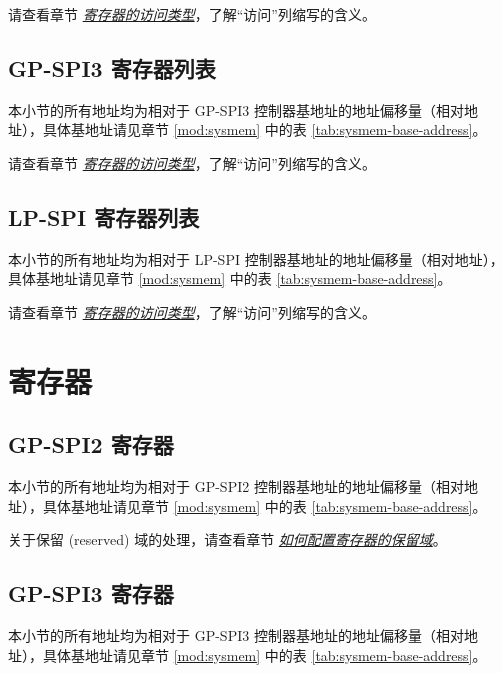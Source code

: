 \documentclass[main\_\_CN.tex]{subfiles}
\begin{document}
请查看章节 \hyperref[glossary-access-types]{\textit{寄存器的访问类型}}，了解“访问”列缩写的含义。


\subsection{GP-SPI3 寄存器列表}
\label{sec:spi3-reg-summ}
本小节的所有地址均为相对于 GP-SPI3 控制器基地址的地址偏移量（相对地址），具体基地址请见章节 \ref{mod:sysmem} \textit{} 中的表 \ref{tab:sysmem-base-address}。

请查看章节 \hyperref[glossary-access-types]{\textit{寄存器的访问类型}}，了解“访问”列缩写的含义。


\subsection{LP-SPI 寄存器列表}
\label{sec:lp-spi-reg-summ}
本小节的所有地址均为相对于 LP-SPI 控制器基地址的地址偏移量（相对地址），具体基地址请见章节 \ref{mod:sysmem} \textit{} 中的表 \ref{tab:sysmem-base-address}。

请查看章节 \hyperref[glossary-access-types]{\textit{寄存器的访问类型}}，了解“访问”列缩写的含义。


\section{寄存器}\label{Section:SPIREGList}

\subsection{GP-SPI2 寄存器}

本小节的所有地址均为相对于 GP-SPI2 控制器基地址的地址偏移量（相对地址），具体基地址请见章节 \ref{mod:sysmem} \textit{} 中的表 \ref{tab:sysmem-base-address}。

关于保留 (reserved) 域的处理，请查看章节 \hyperref[programming-reserved-field]{\textit{如何配置寄存器的保留域}}。



\subsection{GP-SPI3 寄存器}
本小节的所有地址均为相对于 GP-SPI3 控制器基地址的地址偏移量（相对地址），具体基地址请见章节 \ref{mod:sysmem} \textit{} 中的表 \ref{tab:sysmem-base-address}。
\end{document}
